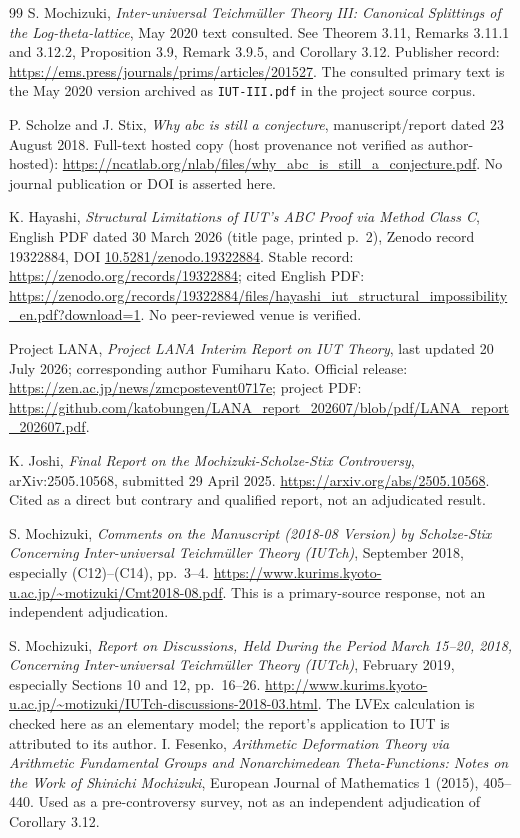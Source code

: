 \documentclass[11pt]{article}
\begin{document}
\begin{thebibliography}{99}
S. Mochizuki, \emph{Inter-universal Teichm\"uller Theory III: Canonical Splittings of the Log-theta-lattice}, May 2020 text consulted. See Theorem 3.11, Remarks 3.11.1 and 3.12.2, Proposition 3.9, Remark 3.9.5, and Corollary 3.12. Publisher record: \url{https://ems.press/journals/prims/articles/201527}. The consulted primary text is the May 2020 version archived as \texttt{IUT-III.pdf} in the project source corpus.

P. Scholze and J. Stix, \emph{Why abc is still a conjecture}, manuscript/report dated 23 August 2018. Full-text hosted copy (host provenance not verified as author-hosted): \url{https://ncatlab.org/nlab/files/why_abc_is_still_a_conjecture.pdf}. No journal publication or DOI is asserted here.

K. Hayashi, \emph{Structural Limitations of IUT's ABC Proof via Method Class C}, English PDF dated 30 March 2026 (title page, printed p.~2), Zenodo record 19322884, DOI \href{https://doi.org/10.5281/zenodo.19322884}{10.5281/zenodo.19322884}. Stable record: \url{https://zenodo.org/records/19322884}; cited English PDF: \url{https://zenodo.org/records/19322884/files/hayashi_iut_structural_impossibility_en.pdf?download=1}. No peer-reviewed venue is verified.

Project LANA, \emph{Project LANA Interim Report on IUT Theory}, last updated 20 July 2026; corresponding author Fumiharu Kato. Official release: \url{https://zen.ac.jp/news/zmcpostevent0717e}; project PDF: \url{https://github.com/katobungen/LANA_report_202607/blob/pdf/LANA_report_202607.pdf}.

K. Joshi, \emph{Final Report on the Mochizuki-Scholze-Stix Controversy}, arXiv:2505.10568, submitted 29 April 2025. \url{https://arxiv.org/abs/2505.10568}. Cited as a direct but contrary and qualified report, not an adjudicated result.

S. Mochizuki, \emph{Comments on the Manuscript (2018-08 Version) by Scholze-Stix Concerning Inter-universal Teichm\"uller Theory (IUTch)}, September 2018, especially (C12)--(C14), pp.~3--4. \url{https://www.kurims.kyoto-u.ac.jp/~motizuki/Cmt2018-08.pdf}. This is a primary-source response, not an independent adjudication.

S. Mochizuki, \emph{Report on Discussions, Held During the Period March 15--20, 2018, Concerning Inter-universal Teichm\"uller Theory (IUTch)}, February 2019, especially Sections 10 and 12, pp.~16--26. \url{http://www.kurims.kyoto-u.ac.jp/~motizuki/IUTch-discussions-2018-03.html}. The LVEx calculation is checked here as an elementary model; the report's application to IUT is attributed to its author.
I. Fesenko, \emph{Arithmetic Deformation Theory via Arithmetic Fundamental Groups and Nonarchimedean Theta-Functions: Notes on the Work of Shinichi Mochizuki}, European Journal of Mathematics 1 (2015), 405--440. Used as a pre-controversy survey, not as an independent adjudication of Corollary 3.12.


\end{thebibliography}
\end{document}
